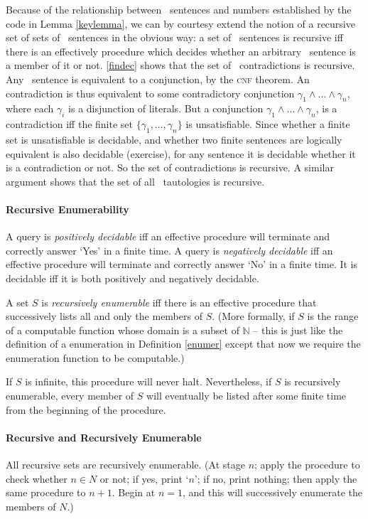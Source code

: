 Because of the relationship between \lone\ sentences and numbers established by the code in Lemma \autoref{keylemma}, we can by courtesy extend the notion of a recursive set of sets of \lone\ sentences in the obvious way: a set of \lone\ sentences is recursive iff there is an effectively procedure which decides whether an arbitrary \lone\ sentence is a member of it or not. \autoref{findec} shows that the set of \lone\ contradictions is recursive. Any \lone\ sentence is equivalent to a conjunction, by the \textsc{cnf} theorem. An contradiction is thus equivalent to some contradictory conjunction $\gamma_{1}\wedge…\wedge \gamma_{n}$, where each $\gamma_{i}$ is a disjunction of literals. But a conjunction $\gamma_{1}\wedge…\wedge \gamma_{n}$, is a contradiction iff the finite set $\{\gamma_{1},…, \gamma_{n}\}$ is unsatisfiable. Since whether a finite set is unsatisfiable is decidable, and whether two finite sentences are logically equivalent is also decidable (exercise), for any sentence it is decidable whether it is a contradiction or not. So the set of contradictions is recursive. A similar argument shows that the set of all \lone\ tautologies is recursive.  




\paragraph{Recursive Enumerability} A query is \emph{positively decidable} iff an effective procedure will terminate and correctly answer `Yes' in a finite time. A query is \emph{negatively decidable} iff an effective procedure will terminate and correctly answer `No' in a finite time. It is decidable iff it is both positively and negatively decidable.

\begin{definition}
	A set $S$ is \emph{recursively enumerable} iff there is an effective procedure that successively lists all and only the members of $S$. (More formally, if $S$ is the range of a computable function whose domain is a subset of $\mathbb{N}$ – this is just like the definition of a enumeration in Definition \ref{enumer} except that now we require the enumeration function to be computable.)
\end{definition} If $S$ is infinite, this procedure will never halt. Nevertheless, if $S$ is recursively enumerable, every member of $S$ will eventually be listed after some finite time from the beginning of the procedure. 

\paragraph{Recursive and Recursively Enumerable} All recursive sets are recursively enumerable. (At stage $n$; apply the procedure to check whether $n\in N$ or not; if yes, print `$n$'; if no, print nothing; then apply the same procedure to $n+1$. Begin at $n=1$, and this will successively enumerate the members of $N$.)

